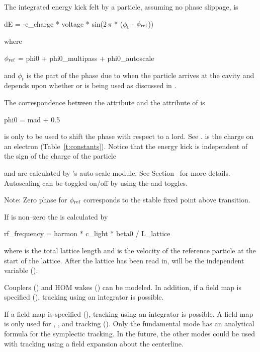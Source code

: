 {The integrated energy kick felt by a particle, assuming no phase slippage, is 
\begin{example}
  dE = -e_charge * voltage * sin(\(2\,\pi\) * (\(\phi_\text{t}\) - \(\phi_{\text{ref}}\)))
\end{example}
where
\begin{example}
  \(\phi_{\text{ref}}\) = phi0 + phi0_multipass + phi0_autoscale
  \label{rfcav.phi}
\end{example}
and $\phi_t$ is the part of the phase due to when the particle arrives at the cavity and depends
upon whether  or  is being used as discussed
in .

The correspondence between the \bmad {} attribute and the  attribute of
\mad is
\begin{example}
  phi0 = mad + 0.5
\end{example}

 is only to be used to shift the phase with respect to a  lord. See
.  is the charge on an electron (Table~\ref{t:constants}). Notice
that the energy kick is independent of the sign of the charge of the particle

 and  are calculated by \bmad's auto-scale module. See
Section~ for more details. Autoscaling can be toggled on/off by using the
 and  toggles.

Note: Zero phase for $\phi_{\text{ref}}$ corresponds to the stable fixed point above transition.

If  is non--zero the  is calculated by
\begin{example}
  rf_frequency = harmon * c_light * beta0 / L_lattice 
\end{example}
where  is the total lattice length and  is the
velocity of the reference particle at the start of the lattice. After
the lattice has been read in,  will be the
independent variable ().

Couplers () and HOM wakes () can
be modeled. In addition, if a field map is specified
(), tracking using an integrator is possible.

If a field map is specified (), tracking using an integrator is possible. A field
map is only used for , , and 
tracking ().  Only the fundamental mode has an analytical formula for the symplectic
tracking. In the future, the other modes could be used with  tracking using a
field expansion about the centerline.

}
